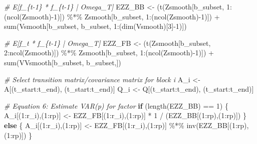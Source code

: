 \documentclass[
]{article}
\newenvironment{Shaded}{\begin{snugshade}}{\end{snugshade}}
\newcommand{\CommentTok}[1]{\textcolor[rgb]{0.56,0.35,0.01}{\textit{#1}}}
\newcommand{\ControlFlowTok}[1]{\textcolor[rgb]{0.13,0.29,0.53}{\textbf{#1}}}
\newcommand{\DecValTok}[1]{\textcolor[rgb]{0.00,0.00,0.81}{#1}}
\newcommand{\FunctionTok}[1]{\textcolor[rgb]{0.00,0.00,0.00}{#1}}
\newcommand{\NormalTok}[1]{#1}
\newcommand{\OtherTok}[1]{\textcolor[rgb]{0.56,0.35,0.01}{#1}}
\newcommand{\SpecialCharTok}[1]{\textcolor[rgb]{0.00,0.00,0.00}{#1}}
\begin{document}
\begin{Shaded}
\begin{Highlighting}[]
    \CommentTok{\# E[f\_\{t{-}1\} * f\_\{t{-}1\}\textquotesingle{} | Omega\_T]}
\NormalTok{    EZZ\_BB }\OtherTok{\textless{}{-}}\NormalTok{ (}\FunctionTok{t}\NormalTok{(Zsmooth[b\_subset, }\DecValTok{1}\SpecialCharTok{:}\NormalTok{(}\FunctionTok{ncol}\NormalTok{(Zsmooth)}\SpecialCharTok{{-}}\DecValTok{1}\NormalTok{)]) }\SpecialCharTok{\%*\%}\NormalTok{ Zsmooth[b\_subset, }\DecValTok{1}\SpecialCharTok{:}\NormalTok{(}\FunctionTok{ncol}\NormalTok{(Zsmooth)}\SpecialCharTok{{-}}\DecValTok{1}\NormalTok{)]) }\SpecialCharTok{+} \FunctionTok{sum}\NormalTok{(Vsmooth[b\_subset, b\_subset, }\DecValTok{1}\SpecialCharTok{:}\NormalTok{(}\FunctionTok{dim}\NormalTok{(Vsmooth)[}\DecValTok{3}\NormalTok{]}\SpecialCharTok{{-}}\DecValTok{1}\NormalTok{)])}
    
    \CommentTok{\# E[f\_t * f\_\{t{-}1\}\textquotesingle{} | Omega\_T]}
\NormalTok{    EZZ\_FB }\OtherTok{\textless{}{-}}\NormalTok{ (}\FunctionTok{t}\NormalTok{(Zsmooth[b\_subset, }\DecValTok{2}\SpecialCharTok{:}\FunctionTok{ncol}\NormalTok{(Zsmooth)]) }\SpecialCharTok{\%*\%}\NormalTok{ Zsmooth[b\_subset, }\DecValTok{1}\SpecialCharTok{:}\NormalTok{(}\FunctionTok{ncol}\NormalTok{(Zsmooth)}\SpecialCharTok{{-}}\DecValTok{1}\NormalTok{)]) }\SpecialCharTok{+} \FunctionTok{sum}\NormalTok{(VVsmooth[b\_subset, b\_subset,])}
    
    \CommentTok{\# Select transition matrix/covariance matrix for block i}
\NormalTok{    A\_i }\OtherTok{\textless{}{-}}\NormalTok{ A[(t\_start}\SpecialCharTok{:}\NormalTok{t\_end), (t\_start}\SpecialCharTok{:}\NormalTok{t\_end)]}
\NormalTok{    Q\_i }\OtherTok{\textless{}{-}}\NormalTok{ Q[(t\_start}\SpecialCharTok{:}\NormalTok{t\_end), (t\_start}\SpecialCharTok{:}\NormalTok{t\_end)]}
    
    \CommentTok{\# Equation 6: Estimate VAR(p) for factor}
    \ControlFlowTok{if}\NormalTok{ (}\FunctionTok{length}\NormalTok{(EZZ\_BB) }\SpecialCharTok{==} \DecValTok{1}\NormalTok{) \{}
\NormalTok{      A\_i[(}\DecValTok{1}\SpecialCharTok{:}\NormalTok{r\_i),(}\DecValTok{1}\SpecialCharTok{:}\NormalTok{rp)] }\OtherTok{\textless{}{-}}\NormalTok{ EZZ\_FB[(}\DecValTok{1}\SpecialCharTok{:}\NormalTok{r\_i),(}\DecValTok{1}\SpecialCharTok{:}\NormalTok{rp)] }\SpecialCharTok{*} \DecValTok{1} \SpecialCharTok{/}\NormalTok{ (EZZ\_BB[(}\DecValTok{1}\SpecialCharTok{:}\NormalTok{rp),(}\DecValTok{1}\SpecialCharTok{:}\NormalTok{rp)])}
\NormalTok{    \}}
    \ControlFlowTok{else}\NormalTok{ \{}
\NormalTok{      A\_i[(}\DecValTok{1}\SpecialCharTok{:}\NormalTok{r\_i),(}\DecValTok{1}\SpecialCharTok{:}\NormalTok{rp)] }\OtherTok{\textless{}{-}}\NormalTok{ EZZ\_FB[(}\DecValTok{1}\SpecialCharTok{:}\NormalTok{r\_i),(}\DecValTok{1}\SpecialCharTok{:}\NormalTok{rp)] }\SpecialCharTok{\%*\%} \FunctionTok{inv}\NormalTok{(EZZ\_BB[(}\DecValTok{1}\SpecialCharTok{:}\NormalTok{rp),(}\DecValTok{1}\SpecialCharTok{:}\NormalTok{rp)])}
\NormalTok{    \}}
    

\end{Highlighting}
\end{Shaded}
\end{document}

